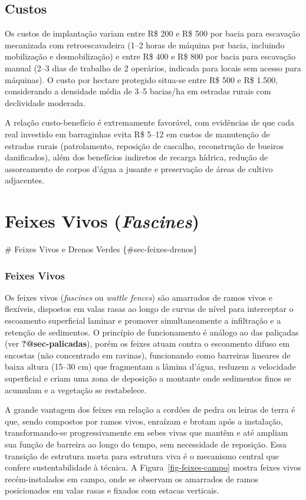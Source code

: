\documentclass[
  portuguese,
  11pt,
  a4paper,
  open=any]{scrbook}
\begin{document}
\section{Custos}\label{custos}

Os custos de implantação variam entre R\$ 200 e R\$ 500 por bacia para
escavação mecanizada com retroescavadeira (1--2 horas de máquina por
bacia, incluindo mobilização e desmobilização) e entre R\$ 400 e R\$ 800
por bacia para escavação manual (2--3 dias de trabalho de 2 operários,
indicada para locais sem acesso para máquinas). O custo por hectare
protegido situa-se entre R\$ 500 e R\$ 1.500, considerando a densidade
média de 3--5 bacias/ha em estradas rurais com declividade moderada.

A relação custo-benefício é extremamente favorável, com evidências de
que cada real investido em barraginhas evita R\$ 5--12 em custos de
manutenção de estradas rurais (patrolamento, reposição de cascalho,
reconstrução de bueiros danificados), além dos benefícios indiretos de
recarga hídrica, redução de assoreamento de corpos d'água a jusante e
preservação de áreas de cultivo adjacentes.

\chapter{\texorpdfstring{Feixes Vivos
(\emph{Fascines})}{Feixes Vivos (Fascines)}}\label{feixes-vivos-fascines}

\# Feixes Vivos e Drenos Verdes \{\#sec-feixes-drenos\}

\subsection{Feixes Vivos}\label{feixes-vivos}

Os feixes vivos (\emph{fascines} ou \emph{wattle fences}) são amarrados
de ramos vivos e flexíveis, dispostos em valas rasas ao longo de curvas
de nível para interceptar o escoamento superficial laminar e promover
simultaneamente a infiltração e a retenção de sedimentos. O princípio de
funcionamento é análogo ao das paliçadas (ver \textbf{?@sec-palicadas}),
porém os feixes atuam contra o escoamento difuso em encostas (não
concentrado em ravinas), funcionando como barreiras lineares de baixa
altura (15--30 cm) que fragmentam a lâmina d'água, reduzem a velocidade
superficial e criam uma zona de deposição a montante onde sedimentos
finos se acumulam e a vegetação se restabelece.

A grande vantagem dos feixes em relação a cordões de pedra ou leiras de
terra é que, sendo compostos por ramos vivos, enraízam e brotam após a
instalação, transformando-se progressivamente em sebes vivas que mantêm
e até ampliam sua função de barreira ao longo do tempo, sem necessidade
de reposição. Essa transição de estrutura morta para estrutura viva é o
mecanismo central que confere sustentabilidade à técnica. A
Figura~\ref{fig-feixes-campo} mostra feixes vivos recém-instalados em
campo, onde se observam os amarrados de ramos posicionados em valas
rasas e fixados com estacas verticais.
\end{document}
